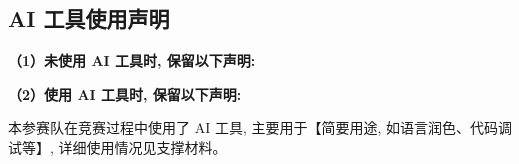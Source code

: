 \subsection*{AI 工具使用声明}



\textbf{（1）未使用 AI 工具时, 保留以下声明:}


\textbf{（2）使用 AI 工具时, 保留以下声明:}

本参赛队在竞赛过程中使用了 AI 工具, 主要用于【简要用途, 如语言润色、代码调试等】, 详细使用情况见支撑材料。
